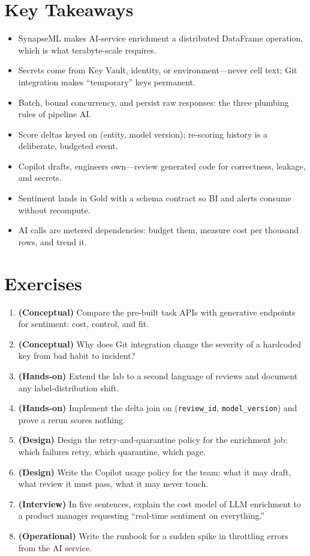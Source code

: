 \section*{Key Takeaways}
\begin{itemize}
    \item SynapseML makes AI-service enrichment a distributed DataFrame operation, which is what terabyte-scale requires.
    \item Secrets come from Key Vault, identity, or environment---never cell text; Git integration makes ``temporary'' keys permanent.
    \item Batch, bound concurrency, and persist raw responses: the three plumbing rules of pipeline AI.
    \item Score deltas keyed on (entity, model version); re-scoring history is a deliberate, budgeted event.
    \item Copilot drafts, engineers own---review generated code for correctness, leakage, and secrets.
    \item Sentiment lands in Gold with a schema contract so BI and alerts consume without recompute.
    \item AI calls are metered dependencies: budget them, measure cost per thousand rows, and trend it.
\end{itemize}

\section{Exercises}
\begin{enumerate}
    \item \textbf{(Conceptual)} Compare the pre-built task APIs with generative endpoints for sentiment: cost, control, and fit.
    \item \textbf{(Conceptual)} Why does Git integration change the severity of a hardcoded key from bad habit to incident?
    \item \textbf{(Hands-on)} Extend the lab to a second language of reviews and document any label-distribution shift.
    \item \textbf{(Hands-on)} Implement the delta join on (\texttt{review\_id}, \texttt{model\_version}) and prove a rerun scores nothing.
    \item \textbf{(Design)} Design the retry-and-quarantine policy for the enrichment job: which failures retry, which quarantine, which page.
    \item \textbf{(Design)} Write the Copilot usage policy for the team: what it may draft, what review it must pass, what it may never touch.
    \item \textbf{(Interview)} In five sentences, explain the cost model of LLM enrichment to a product manager requesting ``real-time sentiment on everything.''
    \item \textbf{(Operational)} Write the runbook for a sudden spike in throttling errors from the AI service.
\end{enumerate}

